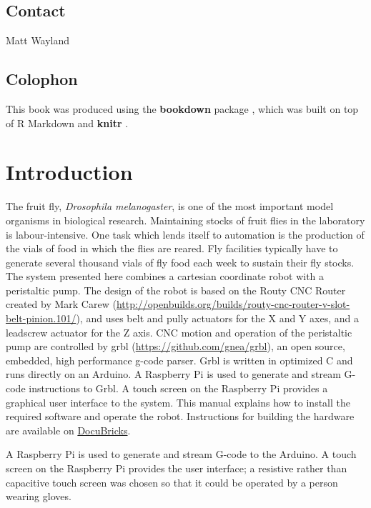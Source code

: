 \documentclass[]{book}
\theoremstyle{definition}
\theoremstyle{definition}
\theoremstyle{remark}
\begin{document}
\section*{Contact}\label{contact}

Matt Wayland

\section*{Colophon}\label{colophon}

This book was produced using the \textbf{bookdown} package
\citep{R-bookdown}, which was built on top of R Markdown and
\textbf{knitr} \citep{xie2015}.

\chapter{Introduction}\label{intro}

The fruit fly, \emph{Drosophila melanogaster}, is one of the most
important model organisms in biological research. Maintaining stocks of
fruit flies in the laboratory is labour-intensive. One task which lends
itself to automation is the production of the vials of food in which the
flies are reared. Fly facilities typically have to generate several
thousand vials of fly food each week to sustain their fly stocks. The
system presented here combines a cartesian coordinate robot with a
peristaltic pump. The design of the robot is based on the Routy CNC
Router created by Mark Carew
(\url{http://openbuilds.org/builds/routy-cnc-router-v-slot-belt-pinion.101/}),
and uses belt and pully actuators for the X and Y axes, and a leadscrew
actuator for the Z axis. CNC motion and operation of the peristaltic
pump are controlled by grbl (\url{https://github.com/gnea/grbl}), an
open source, embedded, high performance g-code parser. Grbl is written
in optimized C and runs directly on an Arduino. A Raspberry Pi is used
to generate and stream G-code instructions to Grbl. A touch screen on
the Raspberry Pi provides a graphical user interface to the system. This
manual explains how to install the required software and operate the
robot. Instructions for building the hardware are available on
\href{http://docubricks.com/viewer.jsp?id=8652757760093769728}{DocuBricks}.

A Raspberry Pi is used to generate and stream G-code to the Arduino. A
touch screen on the Raspberry Pi provides the user interface; a
resistive rather than capacitive touch screen was chosen so that it
could be operated by a person wearing gloves.
\end{document}
